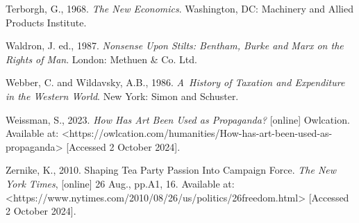 Terborgh, G., 1968. \textit{The New Economics}. Washington, DC: Machinery and Allied Products Institute.



Waldron, J. ed., 1987. \textit{Nonsense Upon Stilts: Bentham, Burke and Marx on the Rights of Man}. London: Methuen \& Co. Ltd.



Webber, C. and Wildavsky, A.B., 1986. \textit{A~History of Taxation and Expenditure in the Western World}. New York: Simon and Schuster.



Weissman, S., 2023. \textit{How Has Art Been Used as Propaganda?} [online] Owlcation. Available at: {\textless}https://owlcation.com/humanities/How-has-art-been-used-as-propaganda{\textgreater} [Accessed 2 October 2024].



Zernike, K., 2010. Shaping Tea Party Passion Into Campaign Force. \textit{The New York Times}, [online] 26 Aug., pp.A1, 16. Available at: {\textless}https://www.nytimes.com/2010/08/26/us/politics/26freedom.html{\textgreater} [Accessed 2 October 2024].





